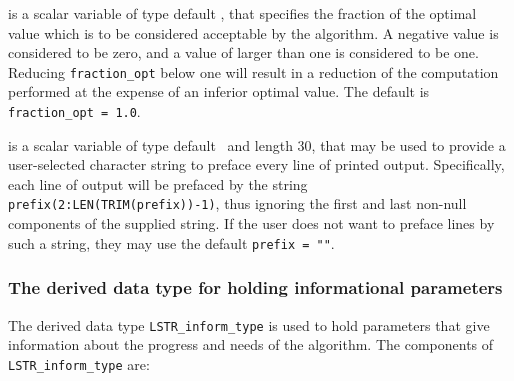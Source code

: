 \documentclass{galahad}
\newcommand{\packagename}{LS\-TR}
\begin{document}
\begin{description}
 is a scalar variable of type default 
\realdp, that specifies the fraction 
of the optimal value which is to be considered acceptable by the algorithm. 
A negative value is considered to be zero, and a value of larger than one 
is considered to be one. Reducing {\tt fraction\_opt} below one will result 
in a reduction of the computation performed at the expense of an inferior 
optimal value. 
The default is {\tt fraction\_opt = 1.0}.

 is a scalar variable of type default \character\
and length 30, that may be used to provide a user-selected 
character string to preface every line of printed output. 
Specifically, each line of output will be prefaced by the string 
{\tt prefix(2:LEN(TRIM(prefix))-1)},
thus ignoring the first and last non-null components of the
supplied string. If the user does not want to preface lines by such
a string, they may use the default {\tt prefix = ""}.

\end{description}


\subsubsection{The derived data type for holding informational
 parameters}\label{typeinform}
The derived data type 
{\tt \packagename\_inform\_type} 
is used to hold parameters that give information about the progress and needs 
of the algorithm. The components of
{\tt \packagename\_inform\_type} 
are:
\end{document}
